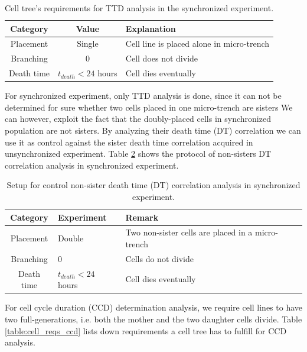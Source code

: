 \documentclass[pdftex,12pt,a4paper]{report}
\begin{document}
\begin{table}[H]
\centering
\begin{tabular}{ c | c | l }
\hline
Category & Value & Explanation \\
\hline\hline
Placement & Single & Cell line is placed alone in micro-trench \\
Branching & 0 & Cell does not divide \\
Death time & $t_{death} < 24$ hours  & Cell dies eventually
\end{tabular}
\caption[Cell tree's requirements for TTD analysis in the synchronized experiment]{Cell tree's requirements for TTD analysis in the synchronized experiment.}
\label{table:cell_reqs_syn}
\end{table}

For synchronized experiment, only TTD analysis is done, since it can not be  determined for sure whether two cells placed in one micro-trench are sisters We can however, exploit the fact that the doubly-placed cells in synchronized population are not sisters. By analyzing their death time (DT) correlation we can use it as control against the sister death time correlation acquired in unsynchronized experiment. Table \ref{table:dt_setup} shows the protocol of non-sisters DT correlation analysis in synchronized experiment.

\begin{table}[H]
\centering
\begin{tabular}{ c | l | l }
\hline
Category & Experiment & Remark \\
\hline\hline
Placement & Double & Two non-sister cells are placed in a micro-trench\\
Branching & 0 & Cells do not divide \\
Death time & $t_{death} < 24$ hours  & Cell dies eventually
\end{tabular}
\caption[Requirements for control non-sister death time (DT) correlation analysis]{Setup for control non-sister death time (DT) correlation analysis in synchronized experiment.}
\label{table:dt_setup}
\end{table}


For cell cycle duration (CCD) determination analysis, we require cell lines to have two full-generations, i.e. both the mother and the two daughter cells divide. Table \ref{table:cell_reqs_ccd} lists down requirements a cell tree has to fulfill for CCD analysis.
\end{document}
